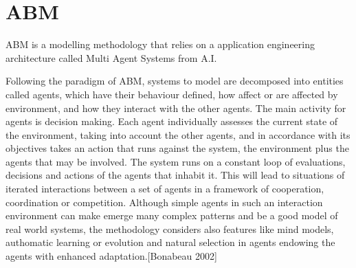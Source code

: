 \documentclass[11pt,oneside,a4paper,openright]{report}
\begin{document}
\section{ABM}


ABM is a modelling methodology that relies on a application engineering architecture called Multi Agent Systems from A.I.
 
Following the paradigm of ABM, systems to model are decomposed into entities called agents, which have their behaviour defined,  how affect or are affected by environment, and how they interact with the other agents. The main activity for agents is decision making. Each agent individually assesses the current state of the environment, taking into account the other agents, and in accordance with its objectives takes an action that runs against the system, the environment plus the agents that may be involved. The system runs on a constant loop of evaluations, decisions and actions of the agents that inhabit it.
This will lead to situations of iterated interactions between a set of agents in a framework of cooperation, coordination or competition. Although simple agents in such an interaction environment can  make emerge many complex patterns and be a good model of real world systems, the methodology considers also features like mind models, authomatic learning or evolution and natural selection in agents endowing the agents with enhanced adaptation.[Bonabeau 2002]  
\end{document}
